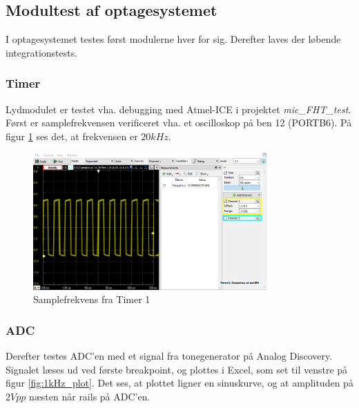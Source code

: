 \subsection{Modultest af optagesystemet}
I optagesystemet testes først modulerne hver for sig. 
Derefter laves der løbende integrationstests. 
\subsubsection{Timer}
Lydmodulet er testet vha. debugging med Atmel-ICE i projektet \textit{mic\_FHT\_test}.
Først er samplefrekvensen verificeret vha. et oscilloskop på ben 12 (PORTB6). 
På figur \ref{fig:test_fs} ses det, at frekvensen er $20 kHz$.

\begin{figure}[H]
	\center
	\includegraphics[width=0.8\textwidth]{Figur/test_timer_freq.png}
	\caption{Samplefrekvens fra Timer 1}
	\label{fig:test_fs}
\end{figure} 

\subsubsection{ADC}
Derefter testes ADC'en med et signal fra tonegenerator på Analog Discovery. Signalet læses ud ved første breakpoint, og plottes i Excel, som set til venstre på figur \ref{fig:1kHz_plot}. 
Det ses, at plottet ligner en sinuskurve, og at amplituden på $2 Vpp$ næsten når rails på ADC'en.

